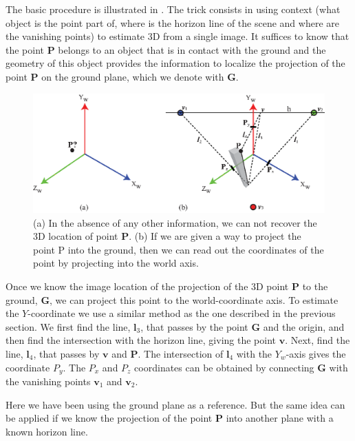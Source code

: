 The basic procedure is illustrated in . The trick consists in using context (what object is the point part of, where is the horizon line of the scene and where are the vanishing points) to estimate 3D from a single image. It suffices to know that the point $\mathbf{P}$ belongs to an object that is in contact with the ground and the geometry of this object provides the information to localize the projection of the point $\mathbf{P}$ on the ground plane, which we denote with $\mathbf{G}$. 

\begin{figure}
\centerline{
\includegraphics[width=1\linewidth]{figures/single_view_3d/locating_a_3d_point.eps}
} 
\caption{(a) In the absence of any other information, we can not recover the 3D location of point $\mathbf{P}$. (b) If we are given a way to project the point P into the ground, then we can read out the coordinates of the point by projecting into the world axis.}
\label{fig:locating_a_3d_point}
\end{figure}

Once we know the image location of the projection of the 3D point $\mathbf{P}$ to the ground, $\mathbf{G}$, we can project this point to the world-coordinate axis. To estimate the $Y$-coordinate we use a similar method as the one described in the previous section. We first find the line, $\boldsymbol{l}_3$,  that passes by the point $\mathbf{G}$ and the origin, and then find the intersection with the horizon line, giving the point $\mathbf{v}$. Next, find the line, $\boldsymbol{l}_4$, that passes by $\mathbf{v}$ and $\mathbf{P}$. The intersection of $\boldsymbol{l}_4$ with the $Y_w$-axis gives the coordinate $P_y$. The $P_x$ and $P_z$ coordinates can be obtained by connecting $\mathbf{G}$ with the vanishing points $\mathbf{v}_1$ and $\mathbf{v}_2$.

Here we have been using the ground plane as a reference. But the same idea can be applied if we know the projection of the point $\mathbf{P}$ into another plane with a known horizon line.

